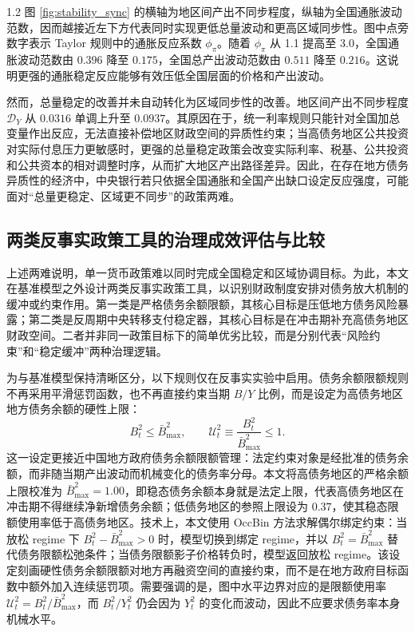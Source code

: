 \documentclass[12pt,UTF8]{ctexart}
\begin{document}
\begin{spacing}{1.2}
		图 \ref{fig:stability_sync} 的横轴为地区间产出不同步程度，纵轴为全国通胀波动范数，因而越接近左下方代表同时实现更低总量波动和更高区域同步性。图中点旁数字表示 Taylor 规则中的通胀反应系数 $\phi_\pi$。随着 $\phi_\pi$ 从 1.1 提高至 3.0，全国通胀波动范数由 $0.396$ 降至 $0.175$，全国总产出波动范数由 $0.511$ 降至 $0.216$。这说明更强的通胀稳定反应能够有效压低全国层面的价格和产出波动。
		
		然而，总量稳定的改善并未自动转化为区域同步性的改善。地区间产出不同步程度 $\mathcal D_Y$ 从 $0.0316$ 单调上升至 $0.0937$。其原因在于，统一利率规则只能针对全国加总变量作出反应，无法直接补偿地区财政空间的异质性约束；当高债务地区公共投资对实际付息压力更敏感时，更强的总量稳定政策会改变实际利率、税基、公共投资和公共资本的相对调整时序，从而扩大地区产出路径差异。因此，在存在地方债务异质性的经济中，中央银行若只依据全国通胀和全国产出缺口设定反应强度，可能面对“总量更稳定、区域更不同步”的政策两难。
		
		\subsection{两类反事实政策工具的治理成效评估与比较}
		
		上述两难说明，单一货币政策难以同时完成全国稳定和区域协调目标。为此，本文在基准模型之外设计两类反事实政策工具，以识别财政制度安排对债务放大机制的缓冲或约束作用。第一类是严格债务余额限额，其核心目标是压低地方债务风险暴露；第二类是反周期中央转移支付稳定器，其核心目标是在冲击期补充高债务地区财政空间。二者并非同一政策目标下的简单优劣比较，而是分别代表“风险约束”和“稳定缓冲”两种治理逻辑。
		
		为与基准模型保持清晰区分，以下规则仅在反事实实验中启用。债务余额限额规则不再采用平滑惩罚函数，也不再直接约束当期 $B/Y$ 比例，而是设定为高债务地区地方债务余额的硬性上限：
		\begin{equation}
			B_t^2\leq \bar B_{\max}^2,\qquad
			\mathcal U_t^2\equiv \frac{B_t^2}{\bar B_{\max}^2}\leq 1.
			\label{eq:strict_debt_cap}
		\end{equation}
		这一设定更接近中国地方政府债务余额限额管理：法定约束对象是经批准的债务余额，而非随当期产出波动而机械变化的债务率分母。本文将高债务地区的严格余额上限校准为 $\bar B_{\max}^2=1.00$，即稳态债务余额本身就是法定上限，代表高债务地区在冲击期不得继续净新增债务余额；低债务地区的参照上限设为 $0.37$，使其稳态限额使用率低于高债务地区。技术上，本文使用 OccBin 方法求解偶尔绑定约束：当放松 regime 下 $B_t^2-\bar B_{\max}^2>0$ 时，模型切换到绑定 regime，并以 $B_t^2=\bar B_{\max}^2$ 替代债务限额松弛条件；当债务限额影子价格转负时，模型返回放松 regime。该设定刻画硬性债务余额限额对地方再融资空间的直接约束，而不是在地方政府目标函数中额外加入连续惩罚项。需要强调的是，图中水平边界对应的是限额使用率 $\mathcal U_t^2=B_t^2/\bar B_{\max}^2$，而 $B_t^2/Y_t^2$ 仍会因为 $Y_t^2$ 的变化而波动，因此不应要求债务率本身机械水平。
		

\end{spacing}
\end{document}
